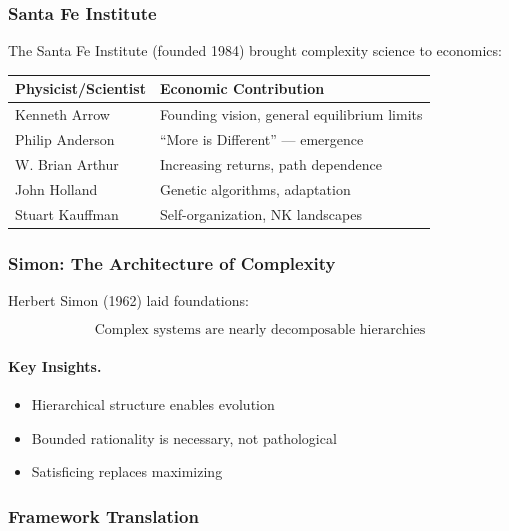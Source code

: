 \subsubsection{Santa Fe Institute}

The Santa Fe Institute (founded 1984) brought complexity science to economics:

\begin{center}
\renewcommand{\arraystretch}{1.3}
\begin{tabular}{|l|l|}
\hline
\textbf{Physicist/Scientist} & \textbf{Economic Contribution} \\
\hline
Kenneth Arrow & Founding vision, general equilibrium limits \\
Philip Anderson & ``More is Different'' --- emergence \\
W. Brian Arthur & Increasing returns, path dependence \\
John Holland & Genetic algorithms, adaptation \\
Stuart Kauffman & Self-organization, NK landscapes \\
\hline
\end{tabular}
\end{center}

\subsubsection{Simon: The Architecture of Complexity}

Herbert Simon (1962) laid foundations:

\begin{equation}
\boxed{
\text{Complex systems are nearly decomposable hierarchies}
}
\label{eq:simon-hierarchy}
\end{equation}

\paragraph{Key Insights.}
\begin{itemize}
    \item Hierarchical structure enables evolution
    \item Bounded rationality is necessary, not pathological
    \item Satisficing replaces maximizing
\end{itemize}

\subsubsection{Framework Translation}

